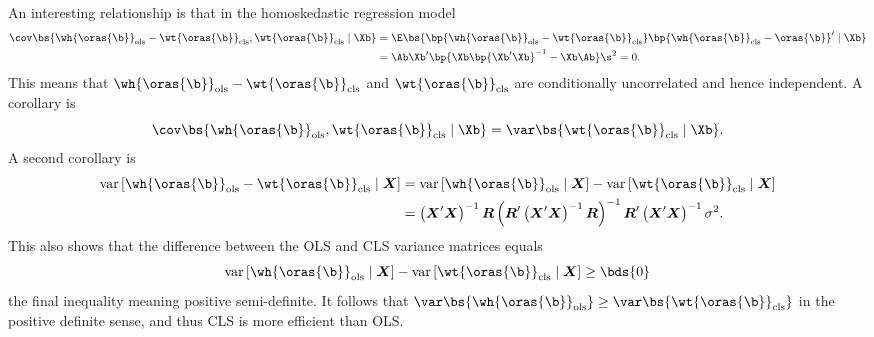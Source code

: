 An interesting relationship is that in the homoskedastic regression model
\begin{equation}
    \notag 
    \begin{aligned}
        \cov\bs{\wh{\oras{\b}}_{\text{ols}} - \wt{\oras{\b}}_{\text{cls}}, \wt{\oras{\b}}_{\text{cls}} \mid \Xb} & = \E\bs{\bp{\wh{\oras{\b}}_{\text{ols}} - \wt{\oras{\b}}_{\text{cls}}} \bp{\wh{\oras{\b}}_{\text{cls}} - {\oras{\b}}}^{\prime} \mid \Xb} \\
        & = \Ab \Xb^{\prime} \bp{\Xb \bp{\Xb^{\prime} \Xb}^{-1} - \Xb \Ab} \s^2 = 0.
    \end{aligned}
\end{equation}
This means that $\wh{\oras{\b}}_{\text{ols}} - \wt{\oras{\b}}_{\text{cls}}$ and $\wt{\oras{\b}}_{\text{cls}}$ are conditionally uncorrelated and hence independent. A corollary is 
\begin{equation}
    \notag 
    \cov\bs{\wh{\oras{\b}}_{\text{ols}}, \wt{\oras{\b}}_{\text{cls}} \mid \Xb} = \var\bs{\wt{\oras{\b}}_{\text{cls}} \mid \Xb}.
\end{equation}
A second corollary is 
\begin{equation}
    \label{hansen_eq_8_18}
    \begin{aligned}
        \operatorname{var}\left[\wh{\oras{\b}}_{\text{ols}}-\wt{\oras{\b}}_{\text{cls}} \mid \boldsymbol{X}\right] & =\operatorname{var}\left[\wh{\oras{\b}}_{\text{ols}} \mid \boldsymbol{X}\right]-\operatorname{var}\left[\wt{\oras{\b}}_{\text{cls}} \mid \boldsymbol{X}\right] \\
        & =\left(\boldsymbol{X}^{\prime} \boldsymbol{X}\right)^{-1} \boldsymbol{R}\left(\boldsymbol{R}^{\prime}\left(\boldsymbol{X}^{\prime} \boldsymbol{X}\right)^{-1} \boldsymbol{R}\right)^{-1} \boldsymbol{R}^{\prime}\left(\boldsymbol{X}^{\prime} \boldsymbol{X}\right)^{-1} \sigma^2 .
    \end{aligned}
\end{equation}
This also shows that the difference between the OLS and CLS variance matrices equals 
\begin{equation}
    \notag 
    \operatorname{var}\left[\wh{\oras{\b}}_{\text{ols}} \mid \boldsymbol{X}\right]-\operatorname{var}\left[\wt{\oras{\b}}_{\text{cls}} \mid \boldsymbol{X}\right] \geq \bds{0}
\end{equation}
the final inequality meaning positive semi-definite. It follows that $\var\bs{\wh{\oras{\b}}_{\text{ols}}} \geq \var\bs{\wt{\oras{\b}}_{\text{cls}}}$ in the positive definite sense, and thus CLS is more efficient than OLS. 

